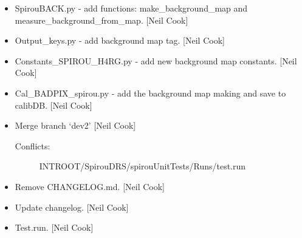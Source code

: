 \documentclass[a4paper,10pt,english]{report}
\begin{document}
\begin{itemize}
\item {} 
SpirouBACK.py - add functions: make\_background\_map and
measure\_background\_from\_map. {[}Neil Cook{]}

\item {} 
Output\_keys.py - add background map tag. {[}Neil Cook{]}

\item {} 
Constants\_SPIROU\_H4RG.py - add new background map constants. {[}Neil
Cook{]}

\item {} 
Cal\_BADPIX\_spirou.py - add the background map making and save to
calibDB. {[}Neil Cook{]}

\item {} 
Merge branch ‘dev2’ {[}Neil Cook{]}
\begin{description}
\item[{Conflicts:}] \leavevmode
INTROOT/SpirouDRS/spirouUnitTests/Runs/test.run

\end{description}

\item {} 
Remove CHANGELOG.md. {[}Neil Cook{]}

\item {} 
Update changelog. {[}Neil Cook{]}

\item {} 
Test.run. {[}Neil Cook{]}

\end{itemize}
\end{document}
